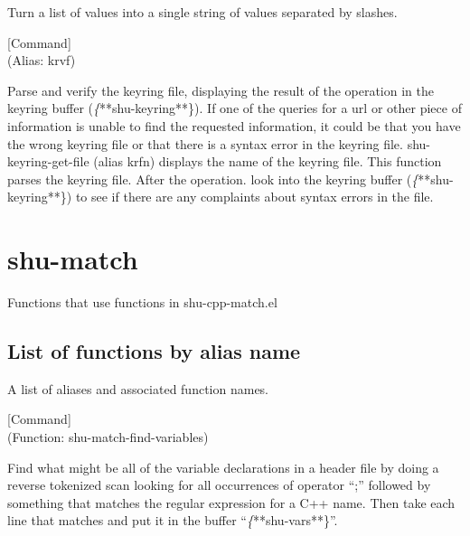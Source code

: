 \begin{doc-string}
Turn a list of values into a single string of values separated by slashes.
\end{doc-string}

\vspace{1em}
\noindent
{}
\usebox{\funcname}
 \hfill [Command]\\%
 (Alias: krvf)

\begin{doc-string}
Parse and verify the keyring file, displaying the result of the operation in the
keyring buffer (\emph\{**shu-keyring**\}).  If one of the queries for a url or other
piece of information is unable to find the requested information, it could be
that you have the wrong keyring file or that there is a syntax error in the
keyring file.  shu-keyring-get-file (alias krfn) displays the name of the
keyring file.  This function parses the keyring file.  After the operation. look
into the keyring buffer (\emph\{**shu-keyring**\}) to see if there are any complaints
about syntax errors in the file.
\end{doc-string}

\eject
\section{shu-match}


Functions that use functions in shu-cpp-match.el


\subsection{List of functions by alias name}

A list of aliases and associated function names.



\vspace{1em}
\noindent
{}
\usebox{\funcname}
 \hfill [Command]\\%
 (Function: shu-match-find-variables)

\begin{doc-string}
Find what might be all of the variable declarations in a header file by doing
a reverse tokenized scan looking for all occurrences of operator ``;'' followed
by something that matches the regular expression for a C++ name.  Then take each
line that matches and put it in the buffer ``\emph\{**shu-vars**\}''.
\end{doc-string}

